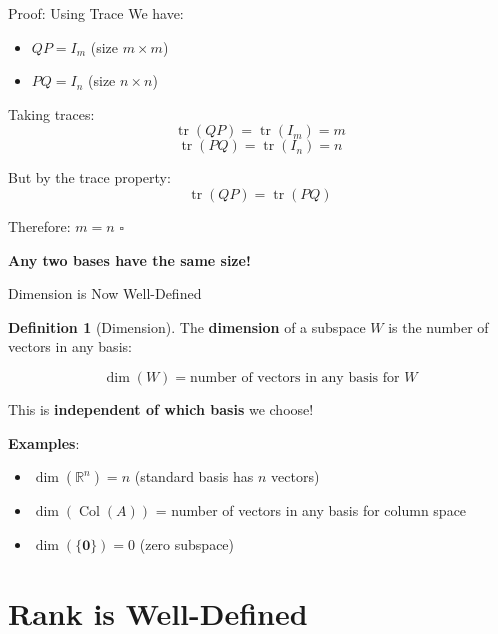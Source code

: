 \documentclass[10pt]{beamer}
\theoremstyle{definition}
\newtheorem{defi}{Definition}[section]
\newcommand{\x}[1]{\alert{\textbf{#1}}}
\begin{document}
\begin{frame}{Proof: Using Trace}
We have:
\begin{itemize}
\item $QP = I_m$ (size $m \times m$)
\item $PQ = I_n$ (size $n \times n$)
\end{itemize}

\vfill
Taking traces:
$$\operatorname{tr}(QP) = \operatorname{tr}(I_m) = m$$
$$\operatorname{tr}(PQ) = \operatorname{tr}(I_n) = n$$

\vfill
But by the trace property:
$$\operatorname{tr}(QP) = \operatorname{tr}(PQ)$$

\vfill
Therefore: $m = n$ $\square$

\vfill
\x{Any two bases have the same size!}
\end{frame}

\begin{frame}{Dimension is Now Well-Defined}
\begin{defi}[Dimension]
The \x{dimension} of a subspace $W$ is the number of vectors in any basis:

$$\dim(W) = \text{number of vectors in any basis for } W$$

This is \x{independent of which basis} we choose!
\end{defi}

\vfill
\x{Examples}:
\begin{itemize}
\item $\dim(\mathbb{R}^n) = n$ (standard basis has $n$ vectors)
\item $\dim(\operatorname{Col}(A))$ = number of vectors in any basis for column space
\item $\dim(\{\mathbf{0}\}) = 0$ (zero subspace)
\end{itemize}
\end{frame}

\section{Rank is Well-Defined}
\end{document}

